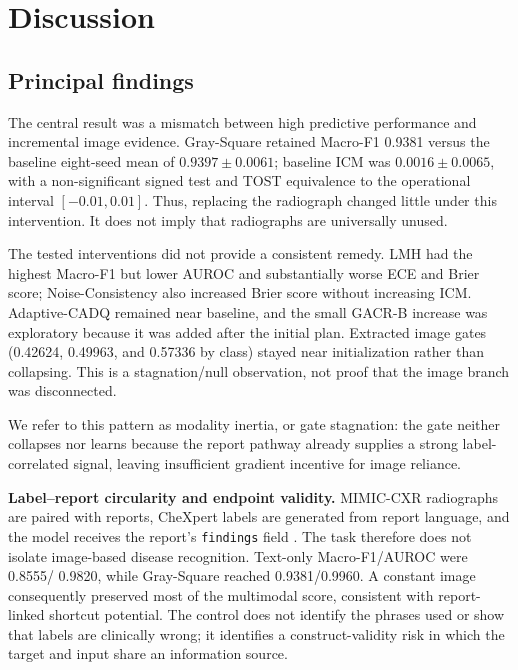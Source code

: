 
\section{Discussion}\label{sec:discussion}

\subsection{Principal findings}\label{sec:discussion-principal}
The central result was a mismatch between high predictive performance and
incremental image evidence. Gray-Square retained Macro-F1 0.9381 versus the
baseline eight-seed mean of $0.9397\pm0.0061$; baseline ICM was
$0.0016\pm0.0065$, with a non-significant signed test and TOST equivalence to
the operational interval $[-0.01,0.01]$. Thus, replacing the radiograph changed
little under this intervention. It does not imply that radiographs are
universally unused.

The tested interventions did not provide a consistent remedy. LMH had the
highest Macro-F1 but lower AUROC and substantially worse ECE and Brier score;
Noise-Consistency also increased Brier score without increasing ICM.
Adaptive-CADQ remained near baseline, and the small GACR-B increase was
exploratory because it was added after the initial plan. Extracted image gates
(0.42624, 0.49963, and 0.57336 by class) stayed near initialization rather than
collapsing. This is a stagnation/null observation, not proof that the image
branch was disconnected.

We refer to this pattern as modality inertia, or gate stagnation: the gate
neither collapses nor learns because the report pathway already supplies a
strong label-correlated signal, leaving insufficient gradient incentive for
image reliance.

\textbf{Label--report circularity and endpoint validity.}
MIMIC-CXR radiographs are paired with reports, CheXpert labels are generated
from report language, and the model receives the report’s \texttt{findings}
field \citep{johnson2019mimiccxr,irvin2019chexpert}. The task therefore does not
isolate image-based disease recognition. Text-only Macro-F1/AUROC were 0.8555/
0.9820, while Gray-Square reached 0.9381/0.9960. A constant image consequently
preserved most of the multimodal score, consistent with report-linked shortcut
potential. The control does not identify the phrases used or show that labels
are clinically wrong; it identifies a construct-validity risk in which the
target and input share an information source.


